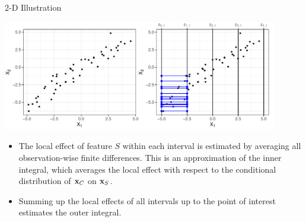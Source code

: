 \documentclass[11pt,compress,t,notes=noshow, xcolor=table]{beamer}
\begin{document}
\begin{vbframe}{2-D Illustration}
\centerline{\includegraphics[width=0.9\textwidth]{figure_man/ale_interval}}

 \begin{itemize}
  \item The local effect of feature $S$ within each interval is estimated by averaging all observation-wise finite differences. This is an approximation of the inner integral, which averages the local effect with respect to the conditional distribution of $\xv_C$ on $\xv_S$.
  \item Summing up the local effects of all intervals up to the point of interest estimates the outer integral.
\end{itemize}

\end{vbframe}
%
%
%
%
%
%
%
%
%
\end{document}
